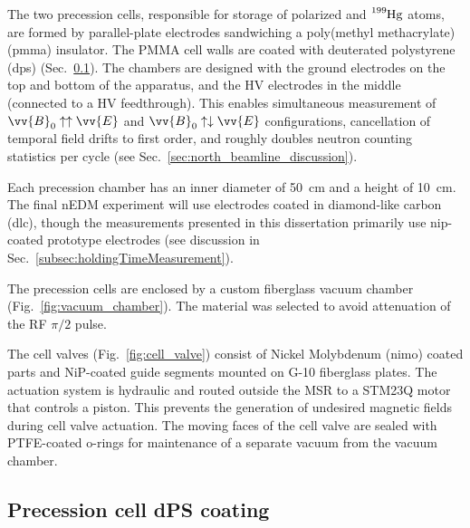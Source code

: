 The two precession cells, responsible for storage of polarized \ucn and $\ce{^{199}Hg}$ atoms, are formed by parallel-plate electrodes sandwiching a poly(methyl methacrylate) (\acrshort*{pmma}) insulator. The PMMA cell walls are coated with deuterated polystyrene (\acrshort*{dps}) (Sec.~\ref{sec:dPS_coating}). The chambers are designed with the ground electrodes on the top and bottom of the apparatus, and the HV electrodes in the middle (connected to a HV feedthrough). This enables simultaneous measurement of $\vv{B}_0\uparrow\uparrow\vv{E}$ and $\vv{B}_0\uparrow\downarrow\vv{E}$ configurations, cancellation of temporal field drifts to first order, and roughly doubles neutron counting statistics per cycle (see Sec.~\ref{sec:north_beamline_discussion}).

Each precession chamber has an inner diameter of \qty{50}{cm} and a height of \qty{10}{cm}. The final nEDM experiment will use electrodes coated in diamond-like carbon (\acrshort*{dlc}), though the measurements presented in this dissertation primarily use \acrshort{nip}-coated prototype electrodes (see discussion in Sec.~\ref{subsec:holdingTimeMeasurement}).

The precession cells are enclosed by a custom fiberglass vacuum chamber (Fig.~\ref{fig:vacuum_chamber}). The material was selected to avoid attenuation of the RF $\pi/2$ pulse.

The cell valves (Fig.~\ref{fig:cell_valve}) consist of Nickel Molybdenum (\acrshort*{nimo}) coated parts and NiP-coated guide segments mounted on G-10 fiberglass plates. The actuation system is hydraulic and routed outside the MSR to a STM23Q motor that controls a piston. This prevents the generation of undesired magnetic fields during cell valve actuation. The moving faces of the cell valve are sealed with PTFE-coated o-rings for maintenance of a separate vacuum from the vacuum chamber.


\subsection{Precession cell dPS coating}\label{sec:dPS_coating}


